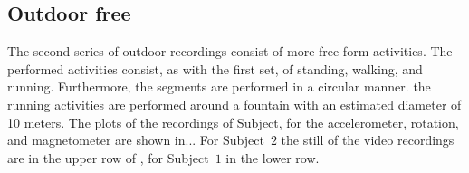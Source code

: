 
\subsection{Outdoor free}\label{subsec:outdoor_free}
The second series of outdoor recordings consist of more free-form activities.
The performed activities consist, as with the first set, of standing, walking, and running.
Furthermore, the segments are performed in a circular manner.
\eg the running activities are performed around a fountain with an estimated diameter of 10 meters.
The plots of the recordings of Subject, for the accelerometer, rotation, and magnetometer are shown in...
For Subject~$2$ the still of the video recordings are in the upper row of , for Subject~$1$ in the lower row.

